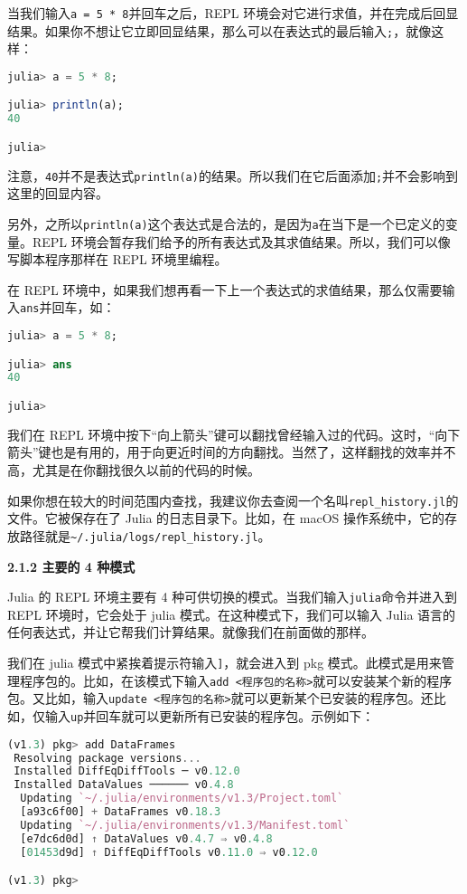 当我们输入\verb`a = 5 * 8`并回车之后，REPL 环境会对它进行求值，并在完成后回显结果。如果你不想让它立即回显结果，那么可以在表达式的最后输入\verb`;`，就像这样：

\begin{lstlisting}[language=julia]
julia> a = 5 * 8;

julia> println(a);
40

julia> 
\end{lstlisting}

注意，\verb`40`并不是表达式\verb`println(a)`的结果。所以我们在它后面添加\verb`;`并不会影响到这里的回显内容。

另外，之所以\verb`println(a)`这个表达式是合法的，是因为\verb`a`在当下是一个已定义的变量。REPL 环境会暂存我们给予的所有表达式及其求值结果。所以，我们可以像写脚本程序那样在 REPL 环境里编程。

在 REPL 环境中，如果我们想再看一下上一个表达式的求值结果，那么仅需要输入\verb`ans`并回车，如：

\begin{lstlisting}[language=julia]
julia> a = 5 * 8;

julia> ans
40

julia> 
\end{lstlisting}

我们在 REPL 环境中按下“向上箭头”键可以翻找曾经输入过的代码。这时，“向下箭头”键也是有用的，用于向更近时间的方向翻找。当然了，这样翻找的效率并不高，尤其是在你翻找很久以前的代码的时候。

如果你想在较大的时间范围内查找，我建议你去查阅一个名叫\verb`repl_history.jl`的文件。它被保存在了 Julia 的日志目录下。比如，在 macOS 操作系统中，它的存放路径就是\verb`~/.julia/logs/repl_history.jl`。

\textbf{2.1.2 主要的 4 种模式}

Julia 的 REPL 环境主要有 4 种可供切换的模式。当我们输入\verb`julia`命令并进入到 REPL 环境时，它会处于 julia 模式。在这种模式下，我们可以输入 Julia 语言的任何表达式，并让它帮我们计算结果。就像我们在前面做的那样。

我们在 julia 模式中紧挨着提示符输入\verb`]`，就会进入到 pkg 模式。此模式是用来管理程序包的。比如，在该模式下输入\verb`add <程序包的名称>`就可以安装某个新的程序包。又比如，输入\verb`update <程序包的名称>`就可以更新某个已安装的程序包。还比如，仅输入\verb`up`并回车就可以更新所有已安装的程序包。示例如下：

\begin{lstlisting}[language=julia]
(v1.3) pkg> add DataFrames
 Resolving package versions...
 Installed DiffEqDiffTools ─ v0.12.0
 Installed DataValues ────── v0.4.8
  Updating `~/.julia/environments/v1.3/Project.toml`
  [a93c6f00] + DataFrames v0.18.3
  Updating `~/.julia/environments/v1.3/Manifest.toml`
  [e7dc6d0d] ↑ DataValues v0.4.7 ⇒ v0.4.8
  [01453d9d] ↑ DiffEqDiffTools v0.11.0 ⇒ v0.12.0

(v1.3) pkg> 
\end{lstlisting}

